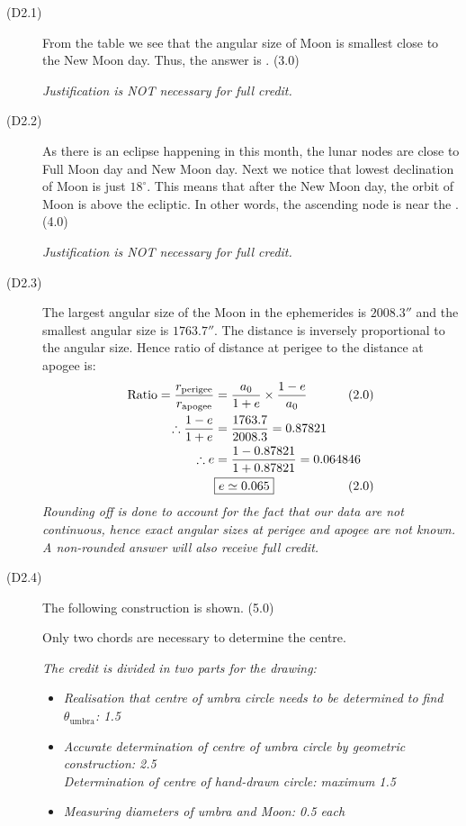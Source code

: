 \begin{description}
\item[(D2.1)]
From the table we see that the angular size of Moon is smallest close to the New Moon day.
Thus, the answer is . \hfill(3.0)

\emph{Justification is NOT necessary for full credit.}

\item[(D2.2)]
As there is an eclipse happening in this month, the lunar nodes are close to Full Moon day
and New Moon day. Next we notice that lowest declination of Moon is just $18^\circ$. This
means that after the New Moon day, the orbit of Moon is above the ecliptic. In other words,
the ascending node is near the . \hfill(4.0)

\emph{Justification is NOT necessary for full credit.}

\item[(D2.3)]
The largest angular size of the Moon in the ephemerides is $2008.3''$ and the smallest
angular size is $1763.7''$. The distance is inversely proportional to the angular size. Hence
ratio of distance at perigee to the distance at apogee is:
\begin{align*}
\mathrm{Ratio} = \frac{r_{\mathrm{perigee}}}{r_{\mathrm{apogee}}}
 &= \frac{a_0}{1+e}\times\frac{1-e}{a_0}
 & &\hspace{-2em}(2.0)\\
\therefore \frac{1-e}{1+e} &= \frac{1763.7}{2008.3} = 0.87821\\
\therefore e &= \frac{1 - 0.87821}{1 + 0.87821} = 0.064846\\
&\fbox{$e \simeq 0.065$}
 & &\hspace{-2em}(2.0)
\end{align*}
\emph{Rounding off is done to account for the fact that our data are not continuous, hence
exact angular sizes at perigee and apogee are not known. A non-rounded answer will also
receive full credit.}

\item[(D2.4)]
The following construction is shown. \hfill(5.0)

Only two chords are necessary to determine the centre.

\emph{The credit is divided in two parts for the drawing:}
\begin{itemize}
\item \emph{Realisation that centre of umbra circle needs to be determined to find
$\theta_{\mathrm{umbra}}$: 1.5}
\item \emph{Accurate determination of centre of umbra circle by geometric construction: 2.5\\
Determination of centre of hand-drawn circle: maximum 1.5}
\item \emph{Measuring diameters of umbra and Moon: 0.5 each}
\end{itemize}


\end{description}
